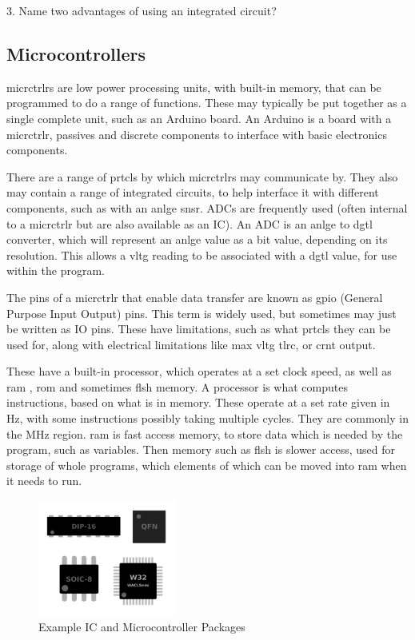 \documentclass[a4paper,11pt]{report}
\begin{document}
3. Name two advantages of using an integrated circuit?

\vspace*{1\baselineskip}

\subsection{Microcontrollers}

\gls{micrctrlr}s are low power processing units, with built-in memory, that can be programmed to do a range of functions. These may typically be put together as a single complete unit, such as an Arduino board. An Arduino is a board with a \gls{micrctrlr}, passives and discrete components to interface with basic electronics components.

There are a range of \gls{prtcl}s by which \gls{micrctrlr}s may communicate by. They also may contain a range of integrated circuits, to help interface it with different components, such as with an \gls{anlge} \gls{snsr}. ADCs are frequently used (often internal to a \gls{micrctrlr} but are also available as an IC). An ADC is an \gls{anlge} to \gls{dgtl} converter, which will represent an \gls{anlge} value as a bit value, depending on its resolution. This allows a \gls{vltg} reading to be associated with a \gls{dgtl} value, for use within the program.

The pins of a \gls{micrctrlr} that enable data transfer are known as \gls{gpio} (General Purpose Input Output) pins. This term is widely used, but sometimes may just be written as IO pins. These have limitations, such as what \gls{prtcl}s they can be used for, along with electrical limitations like max \gls{vltg} \gls{tlrc}, or \gls{crnt} output.

These have a built-in processor, which operates at a set clock speed, as well as \gls{ram} , \gls{rom} and sometimes  \gls{flsh} memory. A processor is what computes instructions, based on what is in memory. These operate at a set rate given in Hz, with some instructions possibly taking multiple cycles. They are commonly in the MHz region. \gls{ram} is fast access memory, to store data which is needed by the program, such as variables. Then memory such as  \gls{flsh} is slower access, used for storage of whole programs, which elements of which can be moved into \gls{ram} when it needs to run.

\begin{figure}[H]
\centering
\includegraphics[width=0.4\textwidth]{icpackages}
\caption{Example IC and Microcontroller Packages}
\end{figure}
\end{document}
